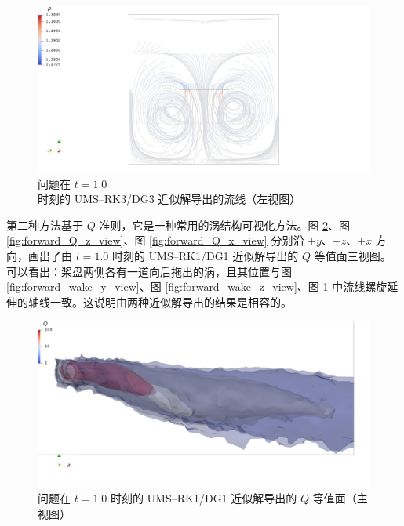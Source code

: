 \begin{figure}[h!]
\begin{centering}
\includegraphics[width=1\textwidth,height=0.26\textheight,keepaspectratio]{figures/forward/p=3/x+}
\par\end{centering}
\caption{\label{fig:forward_wake_x_view}问题在
$t=1.0$ 时刻的 UMS–RK3/DG3 近似解导出的流线（左视图）}
\end{figure}

第二种方法基于 $Q$ 准则，它是一种常用的涡结构可视化方法。图 \ref{fig:forward_Q_y_view}、图
\ref{fig:forward_Q_z_view}、图 \ref{fig:forward_Q_x_view} 分别沿 $+y$、$-z$、$+x$
方向，画出了由 $t=1.0$ 时刻的 UMS–RK1/DG1 近似解导出的 $Q$ 等值面三视图。可以看出：桨盘两侧各有一道向后拖出的涡，且其位置与图
\ref{fig:forward_wake_y_view}、图 \ref{fig:forward_wake_z_view}、图
\ref{fig:forward_wake_x_view} 中流线螺旋延伸的轴线一致。这说明由两种近似解导出的结果是相容的。

\begin{figure}[h!]
\begin{centering}
\includegraphics[width=1\textwidth,height=0.26\textheight,keepaspectratio]{figures/forward/p=1/Q_y+}
\par\end{centering}
\caption{\label{fig:forward_Q_y_view}问题在
$t=1.0$ 时刻的 UMS–RK1/DG1 近似解导出的 $Q$ 等值面（主视图）}
\end{figure}

